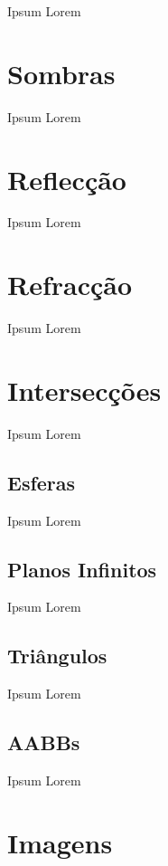 \documentclass[twocolumn]{article}
\begin{document}
    Ipsum Lorem

    \section{Sombras}

    Ipsum Lorem

    \section{Reflecção}

    Ipsum Lorem

    \section{Refracção}

    Ipsum Lorem

    \section{Intersecções}

    Ipsum Lorem

    \subsection{Esferas}

    Ipsum Lorem

    \subsection{Planos Infinitos}

    Ipsum Lorem

    \subsection{Triângulos}

    Ipsum Lorem

    \subsection{AABBs}

    Ipsum Lorem

    \newpage
    \null
    \newpage
    \section{Imagens}
\end{document}
